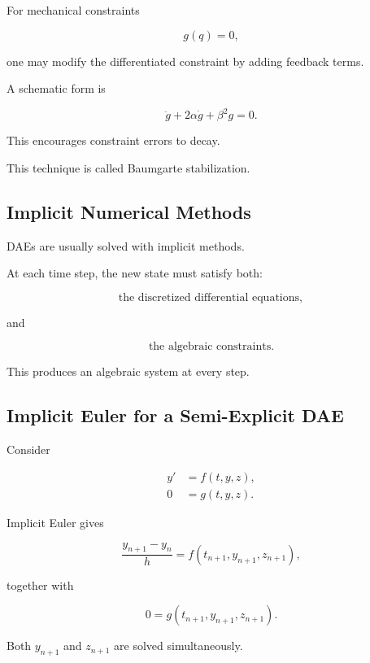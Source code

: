 For mechanical constraints

\[
g(q)=0,
\]

one may modify the differentiated constraint by adding feedback terms.

A schematic form is

\[
\boxed{
\ddot g
+
2\alpha\dot g
+
\beta^2g
=
0.
}
\]

This encourages constraint errors to decay.

This technique is called Baumgarte stabilization.

\subsection{Implicit Numerical Methods}
\label{subsec:implicit-methods-daes}

DAEs are usually solved with implicit methods.

At each time step, the new state must satisfy both:

\[
\boxed{
\text{the discretized differential equations},
}
\]

and

\[
\boxed{
\text{the algebraic constraints}.
}
\]

This produces an algebraic system at every step.

\subsection{Implicit Euler for a Semi-Explicit DAE}
\label{subsec:implicit-euler-dae}

Consider

\[
\begin{aligned}
y'&=f(t,y,z),\\
0&=g(t,y,z).
\end{aligned}
\]

Implicit Euler gives

\[
\boxed{
\frac{
y_{n+1}-y_n
}{
h
}
=
f
(
t_{n+1},
y_{n+1},
z_{n+1}
),
}
\]

together with

\[
\boxed{
0
=
g
(
t_{n+1},
y_{n+1},
z_{n+1}
).
}
\]

Both \(y_{n+1}\) and \(z_{n+1}\) are solved simultaneously.

